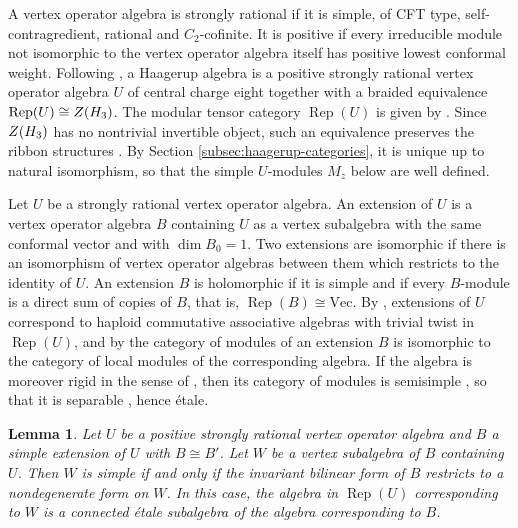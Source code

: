 \documentclass[leqno]{article}
\let\cal\relax
\newcommand{\cal}{\mathcal}
\DeclareMathOperator{\Rep}{Rep} %
\newtheorem{lemma}[thm]{Lemma}
\numberwithin{equation}{section}
\begin{document}
A vertex operator algebra is strongly rational if it is simple, of CFT type, self-contragredient, rational and $C_2$-cofinite. It is positive if every irreducible module not isomorphic to the vertex operator algebra itself has positive lowest conformal weight. Following \cite{Arh26}, a Haagerup algebra is a positive strongly rational vertex operator algebra $U$ of central charge eight together with a braided equivalence $\Rep(U) \cong Z(\cal H_3)$. The modular tensor category $\Rep(U)$ is given by \cite{Hua08}. Since $Z(\cal H_3)$ has no nontrivial invertible object, such an equivalence preserves the ribbon structures \cite[Section 2.2 and Remark 12.6]{Arh26}. By Section \ref{subsec:haagerup-categories}, it is unique up to natural isomorphism, so that the simple $U$-modules $M_z$ below are well defined.

Let $U$ be a strongly rational vertex operator algebra. An extension of $U$ is a vertex operator algebra $B$ containing $U$ as a vertex subalgebra with the same conformal vector and with $\dim B_0 = 1$. Two extensions are isomorphic if there is an isomorphism of vertex operator algebras between them which restricts to the identity of $U$. An extension $B$ is holomorphic if it is simple and if every $B$-module is a direct sum of copies of $B$, that is, $\Rep(B) \cong \mathrm{Vec}$. By \cite[Theorem 3.2 p.~10]{HKL15}, extensions of $U$ correspond to haploid commutative associative algebras with trivial twist in $\Rep(U)$, and by \cite[Theorem 3.4 p.~16]{HKL15} the category of modules of an extension $B$ is isomorphic to the category of local modules of the corresponding algebra. If the algebra is moreover rigid in the sense of \cite[Definition 1.11 p.~10]{KiO02}, then its category of modules is semisimple \cite[Theorem 3.3 p.~17]{KiO02}, so that it is separable \cite[Proposition 2.7 p.~5]{DMNO13}, hence \'etale.

\begin{lemma}
\label{lem:intermediate-etale}
Let $U$ be a positive strongly rational vertex operator algebra and $B$ a simple extension of $U$ with $B \cong B'$. Let $W$ be a vertex subalgebra of $B$ containing $U$. Then $W$ is simple if and only if the invariant bilinear form of $B$ restricts to a nondegenerate form on $W$. In this case, the algebra in $\Rep(U)$ corresponding to $W$ is a connected \'etale subalgebra of the algebra corresponding to $B$.
\end{lemma}
\end{document}

